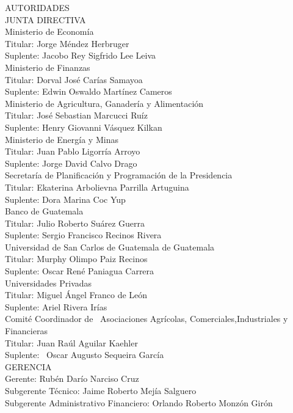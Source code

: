 \begin{center}
	{\Bold \LARGE AUTORIDADES}\\[1cm]
	
	
	{\Bold \large \color{color1!89!black} JUNTA  DIRECTIVA} \\[0.4cm]
	
	{ \Bold Ministerio de Economía}  		\\ 
	Titular: Jorge Méndez Herbruger   \\ 
	Suplente: Jacobo Rey Sigfrido Lee Leiva  \\ [0.4cm] 
	
	{\Bold Ministerio de Finanzas} \\ 
	Titular: Dorval José Carías Samayoa \\ 
	Suplente: Edwin Oswaldo Martínez Cameros\\[0.4cm] 
	
	{\Bold Ministerio de Agricultura, Ganadería y Alimentación} \\ 
	Titular: José Sebastian Marcucci Ruíz   \\ 
	Suplente: Henry Giovanni Vásquez Kilkan \\ [0.4cm] 
	
	{\Bold Ministerio de Energía y Minas}\\ 
	Titular: Juan Pablo Ligorría Arroyo \\ 
	Suplente: Jorge David Calvo Drago\\ [0.4cm]
	{\Bold Secretaría de Planificación y Programación de la Presidencia}   \\
	Titular: Ekaterina Arbolievna Parrilla Artuguina   \\ 
	Suplente: Dora Marina Coc Yup\\ [0.4cm] 
	{\Bold Banco de Guatemala} \\ 
	Titular: Julio Roberto Suárez Guerra \\ 
	Suplente: Sergio Francisco Recinos Rivera\\ [0.4cm] 
	{\Bold Universidad de San Carlos de Guatemala de Guatemala} \\ 
	Titular: Murphy Olimpo Paiz Recinos   \\
	Suplente: Oscar René Paniagua Carrera  \\ [0.4cm]
	{\Bold Universidades Privadas} \\
	Titular: Miguel Ángel Franco de León \\			 Suplente: Ariel Rivera Irías\\ [0.4cm] 
	{\Bold Comité Coordinador de \ Asociaciones  Agrícolas, Comerciales,Industriales y Financieras} \\ 
	Titular: Juan Raúl Aguilar Kaehler \\
	Suplente:  Oscar Augusto Sequeira García  \\ [0.4cm]
	
	{\Bold \large \color{color1!89!black} GERENCIA}\\[0.2cm]
	Gerente:  Rubén Darío Narciso Cruz		\\
	Subgerente Técnico:  Jaime Roberto Mejía Salguero\\
	Subgerente Administrativo Financiero:  Orlando Roberto Monzón Girón\\ 
\end{center}
